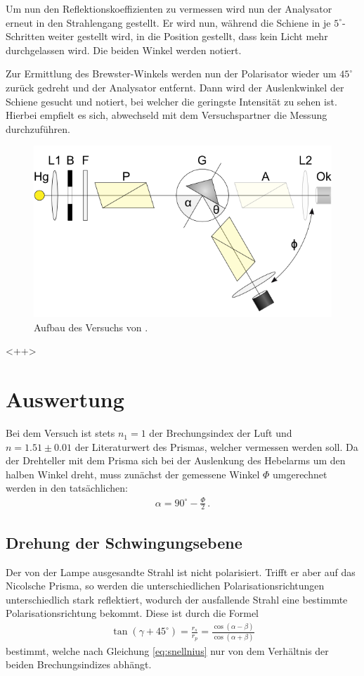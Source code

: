 \documentclass[12pt,a4paper,titlepage,headinclude,bibtotoc]{scrartcl}
\begin{document}
Um nun den Reflektionskoeffizienten zu vermessen wird nun der Analysator erneut in den Strahlengang gestellt.
Er wird nun, während die Schiene in je $5^\circ$-Schritten weiter gestellt wird, in die Position gestellt, dass kein Licht mehr durchgelassen wird.
Die beiden Winkel werden notiert.

Zur Ermittlung des Brewster-Winkels werden nun der Polarisator wieder um $45^\circ$ zurück gedreht und der Analysator entfernt.
Dann wird der Auslenkwinkel der Schiene gesucht und notiert, bei welcher die geringste Intensität zu sehen ist.
Hierbei empfielt es sich, abwechseld mit dem Versuchspartner die Messung durchzuführen.


\begin{figure}[h]
	\centering
	\includegraphics{aufbau}
	\caption{Aufbau des Versuchs von \cite[25.3.2015, 15 Uhr]{lp20}.}
	\label{fig:schiene}
\end{figure}<++>

\section{Auswertung}
\label{sec:auswertung}
Bei dem Versuch ist stets $n_1 =1$ der Brechungsindex der Luft und $n=1.51\pm 0.01$ der Literaturwert des Prismas, welcher vermessen werden soll.
Da der Drehteller mit dem Prisma sich bei der Auslenkung des Hebelarms um den halben Winkel dreht, muss zunächst der gemessene Winkel $\Phi$ umgerechnet werden in den tatsächlichen:
\begin{align*}
	\alpha = 90^\circ - \frac{\Phi}{2}\, .
\end{align*}

\subsection{Drehung der Schwingungsebene}
Der von der Lampe ausgesandte Strahl ist nicht polarisiert.
Trifft er aber auf das Nicolsche Prisma, so werden die unterschiedlichen Polarisationsrichtungen unterschiedlich stark reflektiert, wodurch der ausfallende Strahl eine bestimmte Polarisationsrichtung bekommt.
Diese ist durch die Formel 
\begin{align}
	\tan (\gamma +45^\circ)=\frac{r_s}{r_p}=\frac{\cos(\alpha-\beta)}{\cos (\alpha +\beta)}\label{eq:drehung}
\end{align}
bestimmt, welche nach Gleichung \ref{eq:snellnius} nur von dem Verhältnis der beiden Brechungsindizes abhängt.
\end{document}
